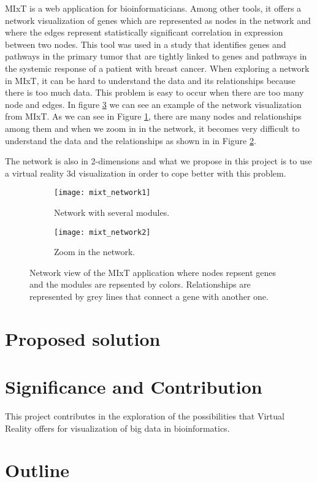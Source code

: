MIxT\cite{fjukstad_dumeaux_olsen_lund_hallett_bongo_2017} is a web application for bioinformaticians. Among other tools, it offers a network visualization of genes which are represented as nodes in the network and where the edges represent statistically significant correlation in expression between two nodes. This tool was used in a study\cite{dumeaux_fjukstad_interactions_tumor_blood} that identifies genes and pathways in the primary tumor that are tightly linked to genes and pathways in the systemic response of a patient with breast cancer.
When exploring a network in MIxT, it can be hard to understand the data and its relationships because there is too much data. This problem is easy to occur when there are too many node and edges. In figure \ref{fig:mixt_network} we can see an example of the network visualization from MIxT. As we can see in Figure \ref{fig:mixt_network1}, there are many nodes and relationships among them and when we zoom in in the network, it becomes very difficult to understand the data and the relationships as shown in in Figure \ref{fig:mixt_network_zoom}.

 The network is also in 2-dimensions and what we propose in this project is to use a virtual reality 3d visualization in order to cope better with this problem.

\begin{figure}[h!]
    \centering%
    \begin{subfigure}[t]{0.5\textwidth}
        \centering%
        \texttt{[image: mixt\_network1]}
        \caption{Network with several modules.}
        \label{fig:mixt_network1}
    \end{subfigure}%
    \begin{subfigure}[t]{0.5\textwidth}
        \centering%
        \texttt{[image: mixt\_network2]}
        \caption{Zoom in the network.}
        \label{fig:mixt_network_zoom}
    \end{subfigure}

    \caption{Network view of the MIxT application where nodes repsent genes and the modules are repsented by colors. Relationships are represented by grey lines that connect a gene with another one.}
    \label{fig:mixt_network}
\end{figure}

\section{Proposed solution}

\section{Significance and Contribution}
This project contributes in the exploration of the possibilities that Virtual Reality offers for visualization of big data in bioinformatics.

\section{Outline}
